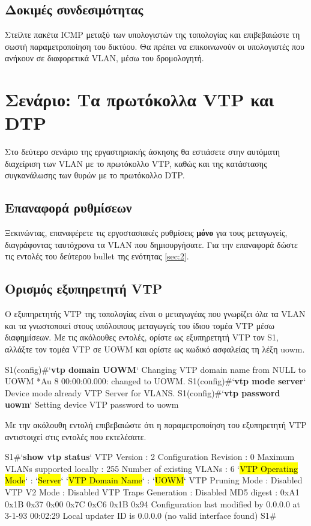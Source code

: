 \documentclass{EdipyLabs} %
\begin{document}
\subsection{Δοκιμές συνδεσιμότητας}
Στείλτε πακέτα ICMP μεταξύ των υπολογιστών της τοπολογίας και επιβεβαιώστε τη σωστή παραμετροποίηση του δικτύου. Θα πρέπει να επικοινωνούν οι υπολογιστές που ανήκουν σε διαφορετικά VLAN, μέσω του δρομολογητή.
\newpage

\section{Σενάριο: Τα πρωτόκολλα VTP και DTP}
Στο δεύτερο σενάριο της εργαστηριακής άσκησης θα εστιάσετε στην αυτόματη διαχείριση των VLAN με το πρωτόκολλο VTP, καθώς και της κατάστασης συγκανάλωσης των θυρών με το πρωτόκολλο DTP. 

\subsection{Επαναφορά ρυθμίσεων}
Ξεκινώντας, επαναφέρετε τις εργοστασιακές ρυθμίσεις \textbf{μόνο} για τους μεταγωγείς, διαγράφοντας ταυτόχρονα τα VLAN που δημιουργήσατε. Για την επαναφορά δώστε τις εντολές του δεύτερου bullet της ενότητας \ref{sec:2}.

\subsection{Ορισμός εξυπηρετητή VTP}
Ο εξυπηρετητής VTP της τοπολογίας είναι ο μεταγωγέας που γνωρίζει όλα τα VLAN και τα γνωστοποιεί στους υπόλοιπους μεταγωγείς του ίδιου τομέα VTP μέσω διαφημίσεων. Με τις ακόλουθες εντολές, ορίστε ως εξυπηρετητή VTP τον S1, αλλάξτε τον τομέα VTP σε UOWM και ορίστε ως κωδικό ασφαλείας τη λέξη uowm.

\begin{CommandBox}
S1(config)#`\textbf{vtp domain UOWM}`
Changing VTP domain name from NULL to UOWM
*Au 8 00:00:00.000: %
changed to UOWM.
S1(config)#`\textbf{vtp mode server}`
Device mode already VTP Server for VLANS.
S1(config)#`\textbf{vtp password uowm}`
Setting device VTP password to uowm
\end{CommandBox}

Με την ακόλουθη εντολή επιβεβαιώστε ότι η παραμετροποίηση του εξυπηρετητή VTP αντιστοιχεί στις εντολές που εκτελέσατε.

\begin{CommandBox}
S1#`\textbf{show vtp status}`
VTP Version                     : 2
Configuration Revision          : 0
Maximum VLANs supported locally : 255
Number of existing VLANs        : 6
`\hl{VTP Operating Mode}`              : `\hl{Server}`
`\hl{VTP Domain Name}`                 : `\hl{UOWM}`
VTP Pruning Mode                : Disabled
VTP V2 Mode                     : Disabled
VTP Traps Generation            : Disabled
MD5 digest                      : 0xA1 0x1B 0x37 0x00 0x7C 0xC6 0x1B 0x94 
Configuration last modified by 0.0.0.0 at 3-1-93 00:02:29
Local updater ID is 0.0.0.0 (no valid interface found)
S1#
\end{CommandBox}
\end{document}
